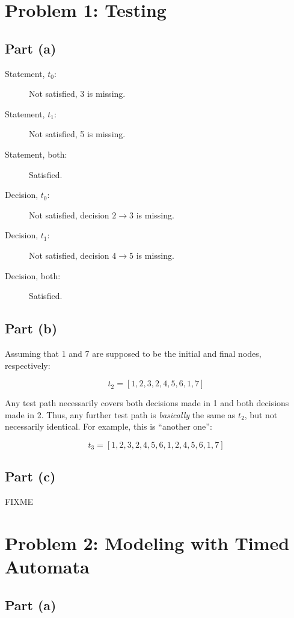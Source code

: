 \documentclass[a4paper,parskip,headheight=38pt]{scrartcl} %
\begin{document}
\section*{Problem 1: Testing}

\subsection*{Part (a)}

\begin{description}
    \item[Statement, $t_0$:] Not satisfied, 3 is missing.
    \item[Statement, $t_1$:] Not satisfied, 5 is missing.
    \item[Statement, both:] Satisfied.
    \item[Decision, $t_0$:] Not satisfied, decision $2 \rightarrow 3$ is missing.
    \item[Decision, $t_1$:] Not satisfied, decision $4 \rightarrow 5$ is missing.
    \item[Decision, both:] Satisfied.
\end{description}

\subsection*{Part (b)}

Assuming that 1 and 7 are supposed to be the initial and final nodes, respectively:

\[ t_2 = [1, 2, 3, 2, 4, 5, 6, 1, 7] \]

Any test path necessarily covers both decisions made in 1 and both
decisions made in 2.  Thus, any further test path is \emph{basically}
the same as $t_2$, but not necessarily identical.  For example, this is
\enquote{another one}:

\[ t_3 = [1, 2, 3, 2, 4, 5, 6, 1, 2, 4, 5, 6, 1, 7] \]

\subsection*{Part (c)}

FIXME


\section*{Problem 2: Modeling with Timed Automata}

\subsection*{Part (a)}
\end{document}
